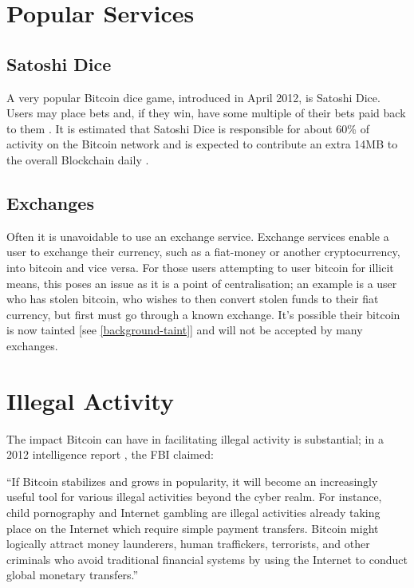 \section{Popular Services}
\subsection{Satoshi Dice}
A very popular Bitcoin dice game, introduced in April 2012, is Satoshi Dice. Users may place bets and, if they win, have some multiple of their bets paid back to them \cite{Refworks:doc:5c3de7e3e4b0ea6196452d80}. It is estimated that Satoshi Dice is responsible for about 60\% of activity on the Bitcoin network and is expected to contribute an extra 14MB to the overall Blockchain daily \cite{Refworks:doc:5c3de7e3e4b0ea6196452d80}. 


\subsection{Exchanges}
Often it is unavoidable to use an exchange service. Exchange services enable a user to exchange their currency, such as a \gls{fiat-money} or another cryptocurrency, into bitcoin and vice versa. For those users attempting to user bitcoin for illicit means, this poses an issue as it is a point of centralisation; an example is a user who has stolen bitcoin, who wishes to then convert stolen funds to their fiat currency, but first must go through a known exchange. It's possible their bitcoin is now tainted [see \ref{background-taint}] and will not be accepted by many exchanges. 

\section{Illegal Activity}

The impact Bitcoin can have in facilitating illegal activity is substantial; in a 2012 intelligence report \cite{RefWorks:doc:5c4ad055e4b0ea619646c15a}, the FBI claimed: 

\begin{displayquote}
 ``If Bitcoin stabilizes and grows in popularity, it will become an increasingly useful tool for various illegal activities beyond the cyber realm. For instance, child pornography and Internet gambling are illegal activities already taking place on the Internet which require simple payment transfers. Bitcoin might logically attract money launderers, human traffickers, terrorists, and other criminals who avoid traditional financial systems by using the Internet to conduct global monetary transfers.''
\end{displayquote}

